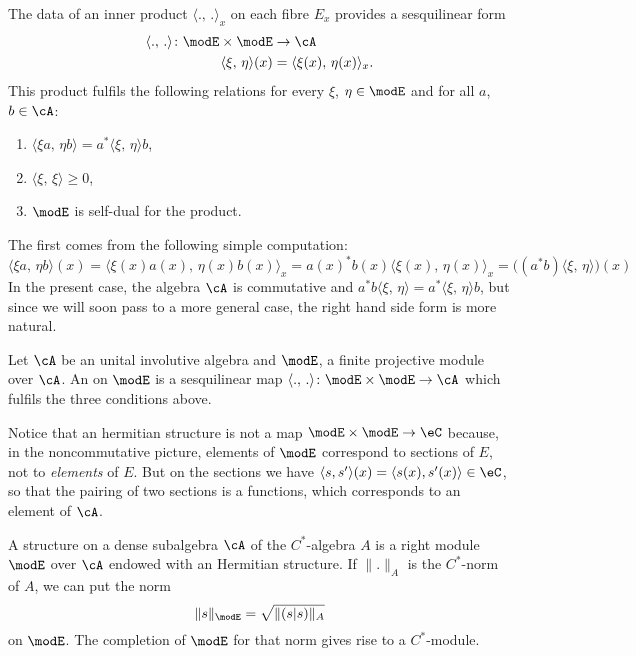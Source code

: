 The data of an inner product $\langle .,\,.\rangle_x$ on each fibre $E_x$ provides a sesquilinear form
\begin{equation}
\begin{aligned}
 \langle .,\,.\rangle\colon \modE\times\modE&\to \cA \\ 
\langle \xi,\,\eta\rangle(x)&=  \langle \xi(x),\,\eta(x)\rangle_x.
\end{aligned}
\end{equation}
This product fulfils the following relations for every $\xi$, $\eta\in\modE$ and for all $a$, $b\in\cA$: 
\begin{enumerate}
\item $\langle \xi a,\,\eta b\rangle=a^*\langle \xi,\,\eta\rangle b$,
\item $\langle \xi,\,\xi\rangle\geq 0$,
\item $\modE$ is self-dual for the product.
\end{enumerate}
The first comes from the following simple computation:
\[ 
  \langle \xi a,\,\eta b\rangle(x)=\langle \xi(x) a(x),\,\eta(x)b(x)\rangle_x=a(x)^*b(x)\langle \xi(x),\,\eta(x)\rangle_x=\big((a^*b)\langle \xi,\,\eta\rangle\big)(x)
\]
In the present case, the algebra $\cA$ is commutative and $a^*b\langle \xi,\,\eta\rangle=a^*\langle \xi,\,\eta\rangle b$, but since we will soon pass to a more general case, the right hand side form is more natural.

\begin{definition}
Let $\cA$ be an unital involutive algebra and $\modE$, a finite projective module over $\cA$. An  on $\modE$ is a sesquilinear map $ \langle .,\,.\rangle\colon \modE\times\modE\to \cA$ which fulfils the three conditions above.
\end{definition}
Notice that an hermitian structure is not a map $\modE\times\modE\to \eC$ because, in the noncommutative picture, elements of $\modE$ correspond to sections of $E$, not to \emph{elements} of $E$. But on the sections we have $\langle s, s'\rangle (x)=\langle s(x),s'(x)\rangle \in \eC$, so that the pairing of two sections is a functions, which corresponds to an element of $\cA$.

A  structure on a dense subalgebra $\cA$ of the $C^*$-algebra $A$ is a right module $\modE$ over $\cA$ endowed with an Hermitian structure. If $\| . \|_A$ is the $C^*$-norm of $A$, we can put the norm 
\begin{equation}
	\| s \|_{\modE}=\sqrt{\| (s|s) \|_A}
\end{equation}
on $\modE$. The completion of $\modE$ for that norm gives rise to a $C^*$-module.

